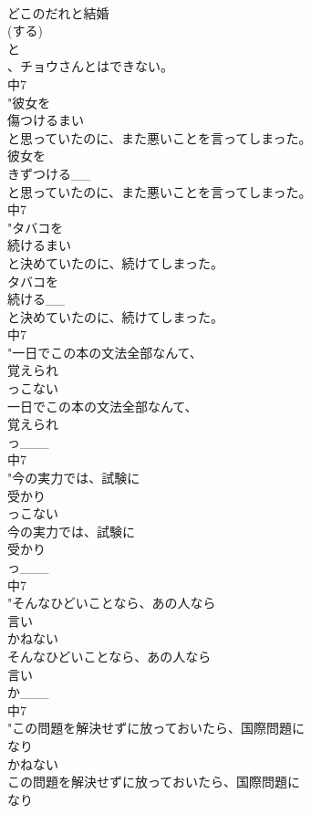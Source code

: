 \documentclass[8pt]{extreport}
\begin{document}
\begin{CJK}{UTF8}{min}
\\	どこのだれと結婚
\\	(する)
\\	と
\\	、チョウさんとはできない。
\\	中7
\\	"彼女を
\\	傷つけるまい
\\	と思っていたのに、また悪いことを言ってしまった。
\\	彼女を
\\	きずつける__
\\	と思っていたのに、また悪いことを言ってしまった。
\\	中7
\\	"タバコを
\\	続けるまい
\\	と決めていたのに、続けてしまった。
\\	タバコを
\\	続ける__
\\	と決めていたのに、続けてしまった。
\\	中7
\\	"一日でこの本の文法全部なんて、
\\	覚えられ
\\	っこない
\\	一日でこの本の文法全部なんて、
\\	覚えられ
\\	っ___
\\	中7
\\	"今の実力では、試験に
\\	受かり
\\	っこない
\\	今の実力では、試験に
\\	受かり
\\	っ___
\\	中7
\\	"そんなひどいことなら、あの人なら
\\	言い
\\	かねない
\\	そんなひどいことなら、あの人なら
\\	言い
\\	か___
\\	中7
\\	"この問題を解決せずに放っておいたら、国際問題に
\\	なり
\\	かねない
\\	この問題を解決せずに放っておいたら、国際問題に
\\	なり

\end{CJK}
\end{document}
